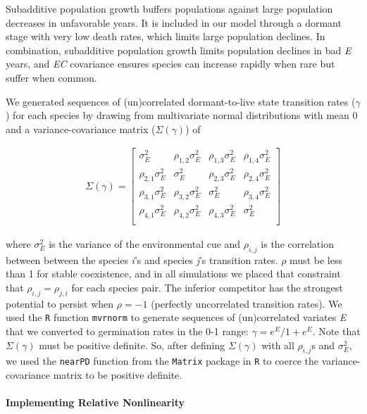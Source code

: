 \documentclass[12pt,]{article}
\begin{document}
Subadditive population growth buffers populations against large
population decreases in unfavorable years. It is included in our model
through a dormant stage with very low death rates, which limits large
population declines. In combination, subadditive population growth
limits population declines in bad \emph{E} years, and \emph{EC}
covariance ensures species can increase rapidly when rare but suffer
when common.

We generated sequences of (un)correlated dormant-to-live state
transition rates (\(\gamma\)) for each species by drawing from
multivariate normal distributions with mean 0 and a variance-covariance
matrix (\(\Sigma(\gamma)\)) of

\begin{align}
\Sigma(\gamma) = 
\begin{bmatrix}
\sigma^2_{E} & \rho_{1,2}\sigma^2_{E} & \rho_{1,3}\sigma^2_{E} & \rho_{1,4}\sigma^2_{E} \\
\rho_{2,1}\sigma^2_{E} & \sigma^2_{E} & \rho_{2,3}\sigma^2_{E} & \rho_{2,4}\sigma^2_{E} \\
\rho_{3,1}\sigma^2_{E} & \rho_{3,2}\sigma^2_{E} & \sigma^2_{E}  & \rho_{3,4}\sigma^2_{E} \\
\rho_{4,1}\sigma^2_{E} & \rho_{4,2}\sigma^2_{E} & \rho_{4,3}\sigma^2_{E} & \sigma^2_{E}  \\
\end{bmatrix}
\end{align}

\noindent where \(\sigma^2_{E}\) is the variance of the environmental
cue and \(\rho_{i,j}\) is the correlation between between the species
\emph{i}'s and species \emph{j}'s transition rates. \(\rho\) must be
less than 1 for stable coexistence, and in all simulations we placed
that constraint that \(\rho_{i,j} = \rho_{j,i}\) for each species pair.
The inferior competitor has the strongest potential to persist when
\(\rho=-1\) (perfectly uncorrelated transition rates). We used the
\texttt{R} function \texttt{mvrnorm} to generate sequences of
(un)correlated variates \emph{E} that we converted to germination rates
in the 0-1 range: \(\gamma = e^E / 1 + e^E\). Note that
\(\Sigma(\gamma)\) must be positive definite. So, after defining
\(\Sigma(\gamma)\) with all \(\rho_{i,j}\)s and \(\sigma^2_{E}\), we
used the \texttt{nearPD} function from the \texttt{Matrix} package in
\texttt{R} to coerce the variance-covariance matrix to be positive
definite.

\paragraph{Implementing Relative
Nonlinearity}\label{implementing-relative-nonlinearity}
\end{document}
